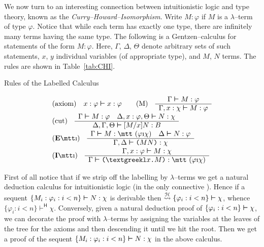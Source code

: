 We now turn to an interesting connection between intuitionistic
logic and type theory, known as the
{\it Curry--Howard--Isomorphism}.
Write $M : \varphi$ if $M$ is a $\lambda$--term of type $\varphi$.
Notice that while each term has exactly one type, there are
infinitely many terms having the same type. The following
is a Gentzen--calculus for statements of the form $M : \varphi$.
Here, $\Gamma$, $\Delta$, $\Theta$ denote arbitrary sets of such
statements, $x$, $y$ individual variables (of appropriate type),
and $M$, $N$ terms. The rules are shown in Table~\ref{tab:CHI}.
\begin{table}
\caption{Rules of the Labelled Calculus}
\label{tab:CHI}
$$\begin{array}{l}
\mbox{\rm (axiom)} \quad
x : \varphi \bvdash x : \varphi
\qquad
\mbox{\rm (M)} \quad \begin{array}{c}
\Gamma \bvdash M : \varphi \\\hline
\Gamma, x : \chi \bvdash M : \varphi
\end{array} \\
\mbox{\rm (cut)} \quad
\begin{array}{c}
\Gamma \bvdash M : \varphi  \quad \Delta, x : \varphi, \Theta \bvdash
    N : \chi \\\hline
\Delta, \Gamma, \Theta \bvdash [M/x]N : B
\end{array}
\\
\mbox{(\textbf{E}{\mtt\symbol{25}})}\quad
\begin{array}{c}
\Gamma \bvdash M : \mbox{\mtt ($\varphi$\symbol{25}$\chi$)}%
	\quad \Delta \bvdash N : \varphi
\\\hline
\Gamma, \Delta \bvdash \mbox{\tt (}MN\mbox{\tt )} : \chi
\end{array}
    \\
\mbox{(\textbf{I}{\mtt\symbol{25}})}\quad
\begin{array}{c}
\Gamma, x : \varphi \bvdash M : \chi \\\hline
\Gamma \bvdash \mbox{\tt (\stlambda$x$.$M$)} :
    \mbox{\mtt ($\varphi$\symbol{25}$\chi$)}
\end{array}
\end{array}$$
\end{table}
First of all notice that if we strip off the labelling by
$\lambda$--terms we get a natural deduction calculus for
intuitionistic logic (in the only connective {\mtt{}}). 
Hence if a sequent $\{M_i : \varphi_i : i < n\} \boldsymbol{\vdash} N : \chi$ 
is derivable then $\stackrel{\mathcal{H}}{\rightsquigarrow} 
\{ \varphi_i : i < n\}\boldsymbol{\vdash} \chi$, whence 
$\{\varphi_i : i < n\} \vdash^{\mathsf{H}} \chi$. 
Conversely, given a natural deduction proof of 
$\{\varphi_i : i < n\} \boldsymbol{\vdash} \chi$, we can decorate the proof with
$\lambda$--terms by assigning the variables at the leaves of the
tree for the axioms and then descending it until we hit the root.
Then we get a proof of the sequent $\{M_i : \varphi_i : i < n\}
\boldsymbol{\vdash} N : \chi$ in the above calculus.

